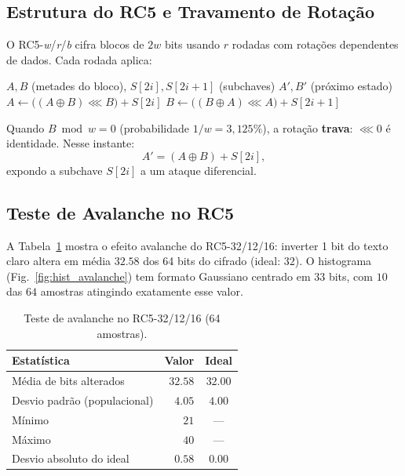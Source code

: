 \documentclass[12pt,a4paper]{article}
\theoremstyle{plain}
\begin{document}
\subsection{Estrutura do RC5 e Travamento de Rotação}

O RC5-\emph{w}/\emph{r}/\emph{b} cifra blocos de $2w$ bits usando
$r$ rodadas com rotações dependentes de dados. Cada rodada aplica:

\begin{algorithm}[H]
\caption{RC5: cifragem de uma rodada}
\label{alg:rc5_round}
\begin{algorithmic}[1]
\Require $A,B$ (metades do bloco), $S[2i],S[2i+1]$ (subchaves)
\Ensure $A',B'$ (próximo estado)
\State $A \gets \bigl((A \oplus B) \lll B\bigr) + S[2i]$
\State $B \gets \bigl((B \oplus A) \lll A\bigr) + S[2i+1]$
\end{algorithmic}
\end{algorithm}

Quando $B \bmod w = 0$ (probabilidade $1/w = 3{,}125\%$), a rotação
\textbf{trava}: $\lll 0$ é identidade. Nesse instante:
\[
A' = (A \oplus B) + S[2i],
\]
expondo a subchave $S[2i]$ a um ataque diferencial.

\subsection{Teste de Avalanche no RC5}

A Tabela~\ref{tab:avalanche} mostra o efeito avalanche do RC5-32/12/16:
inverter 1 bit do texto claro altera em média $32.58$ dos 64 bits do
cifrado (ideal: $32$). O histograma (Fig.~\ref{fig:hist_avalanche}) tem
formato Gaussiano centrado em $33$ bits, com $10$ das $64$ amostras
atingindo exatamente esse valor.

\begin{table}[htbp]
\centering
\caption{Teste de avalanche no RC5-32/12/16 (64 amostras).}
\label{tab:avalanche}
\begin{tabular}{lrc}
\hline
Estatística & Valor & Ideal \\
\hline
Média de bits alterados & $32.58$ & $32.00$ \\
Desvio padrão (populacional) & $4.05$ & $4.00$ \\
Mínimo & $21$ & --- \\
Máximo & $40$ & --- \\
Desvio absoluto do ideal & $0.58$ & $0.00$ \\
\hline
\end{tabular}
\end{table}
\end{document}
